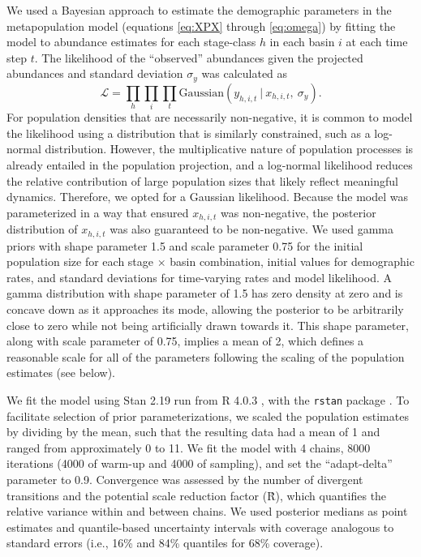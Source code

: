 \documentclass[11pt]{article}
\begin{document}
We used a Bayesian approach to estimate the demographic parameters in the metapopulation model
(equations \ref{eq:XPX} through \ref{eq:omega}) by fitting the model to 
abundance estimates for each stage-class $h$ in each basin $i$ at each time step $t$. 
The likelihood of the ``observed'' abundances given the projected abundances 
and standard deviation $\sigma_y$ was calculated as
%
\begin{equation} \label{eq:likelihood}
\mathcal{L} = 
\displaystyle\prod_{h}
\displaystyle\prod_{i}
\displaystyle\prod_{t}
\text{Gaussian}
    \left(
        y_{h,i,t}~|~x_{h,i,t},~\sigma_y
    \right).
\end{equation}
%
For population densities that are necessarily non-negative, 
it is common to model the likelihood using a distribution that is similarly constrained,
such as a log-normal distribution. 
However, the multiplicative nature of population processes is already entailed 
in the population projection, 
and a log-normal likelihood reduces the relative contribution of large population sizes
that likely reflect meaningful dynamics.
Therefore, we opted for a Gaussian likelihood. 
Because the model was parameterized in a way that ensured
$x_{h,i,t}$ was non-negative,
the posterior distribution of $x_{h,i,t}$ was also guaranteed to be non-negative. 
We used gamma priors with shape parameter 1.5 and scale parameter 0.75
for the initial population size for each stage $\times$ basin combination, 
initial values for demographic rates,
and standard deviations for time-varying rates and model likelihood.
A gamma distribution with shape parameter of 1.5 has zero density at zero 
and is concave down as it approaches its mode,
allowing the posterior to be arbitrarily close to zero 
while not being artificially drawn towards it.
This shape parameter, along with scale parameter of 0.75,
implies a mean of 2, 
which defines a reasonable scale for all of the parameters 
following the scaling of the population estimates (see below).

We fit the model using Stan 2.19 \citep{carpenter2017}
run from R 4.0.3 \citep{r2020}, with the \texttt{rstan} package \citep{Stan2018}.
To facilitate selection of prior parameterizations,
we scaled the population estimates by dividing by the mean,
such that the resulting data had a mean of 1
and ranged from approximately 0 to 11.
We fit the model with 4 chains, 
8000 iterations (4000 of warm-up and 4000 of sampling),
and set the ``adapt-delta'' parameter to 0.9.
Convergence was assessed by the number of divergent transitions 
and the potential scale reduction factor (\^{R}),
which quantifies the relative variance within and between chains. 
We used posterior medians as point estimates
and quantile-based uncertainty intervals
with coverage analogous to standard errors
(i.e., 16\% and 84\% quantiles for 68\% coverage).
\end{document}
